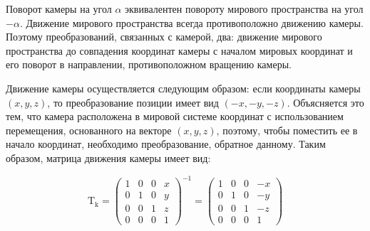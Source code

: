     Поворот камеры на угол \begin{math}\alpha\end{math} эквивалентен повороту мирового пространства на угол \begin{math}-\alpha\end{math}. Движение мирового пространства всегда противоположно движению камеры.
    Поэтому преобразований, связанных с камерой, два: движение мирового пространства до совпадения координат камеры с началом мировых координат и его поворот в направлении, противоположном вращению камеры.
    
    Движение камеры осуществляется следующим образом: если координаты камеры \begin{math}(x, y, z)\end{math}, то преобразование позиции имеет вид \begin{math}(-x, -y, -z)\end{math}. Объясняется это тем, что камера расположена в мировой системе координат с использованием перемещения, основанного на векторе \begin{math}(x, y, z)\end{math}, поэтому, чтобы поместить ее в начало координат, необходимо преобразование, обратное данному. Таким образом, матрица движения камеры имеет вид:
    
    \begin{equation}
  \mathrm{T_k} = \begin{pmatrix}
    1 & 0  & 0 & x\\
    0 & 1 & 0 & y\\
    0 & 0 & 1 & z\\
      0 & 0 & 0 & 1
  \end{pmatrix}^{-1} = \begin{pmatrix}
    1 & 0  & 0 & -x\\
    0 & 1 & 0 & -y\\
    0 & 0 & 1 & -z\\
      0 & 0 & 0 & 1
  \end{pmatrix}
\end{equation}
     
